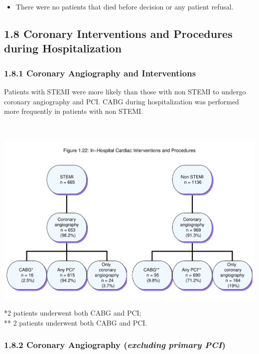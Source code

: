 \documentclass[
]{article}
\providecommand{\tightlist}{%
  \setlength{\itemsep}{0pt}\setlength{\parskip}{0pt}}
\begin{document}
\begin{itemize}
\tightlist
\item
  There were no patients that died before decision or any patient
  refusal.
\end{itemize}

\pagebreak

\subsection{1.8 Coronary Interventions and Procedures during
Hospitalization}\label{coronary-interventions-and-procedures-during-hospitalization}

\subsubsection{1.8.1 Coronary Angiography and
Interventions}\label{coronary-angiography-and-interventions}

Patients with STEMI were more likely than those with non STEMI to
undergo coronary angiography and PCI. CABG during hospitalization was
performed more frequently in patients with non STEMI.

~

\includegraphics{‏‏ACSIS_2024_v1_with_trend_pdf_files/figure-latex/unnamed-chunk-74-1.pdf}

*2 patients underwent both CABG and PCI;\\
** 2 patients underwent both CABG and PCI.

\pagebreak

\subsubsection{\texorpdfstring{1.8.2 Coronary Angiography
(\textbf{\emph{excluding}} \emph{primary
PCI})}{1.8.2 Coronary Angiography (excluding primary PCI)}}\label{coronary-angiography-excluding-primary-pci}
\end{document}
